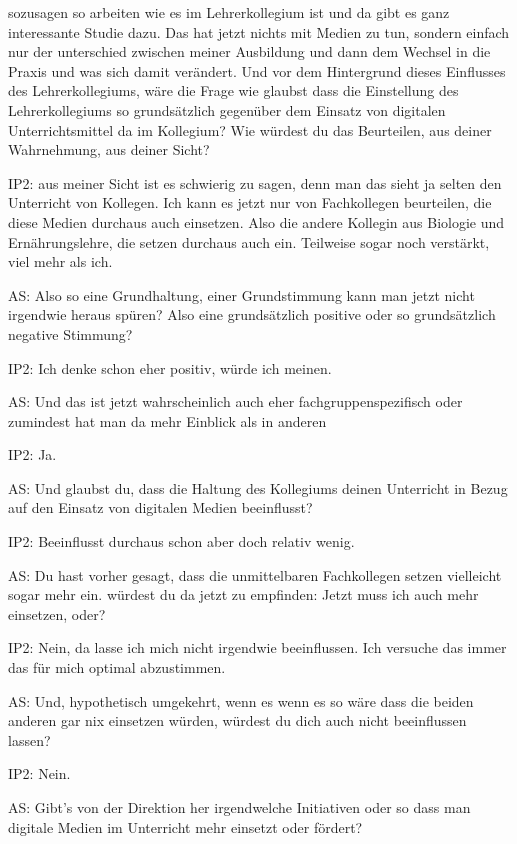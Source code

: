 \documentclass[fontsize=11pt,paper=a4]{scrbook}
\begin{document}
{\begin{itemize*}
sozusagen so arbeiten wie es im
Lehrerkollegium ist und da gibt es
ganz interessante Studie dazu. Das
hat jetzt nichts mit Medien zu tun, sondern
einfach nur der unterschied zwischen
meiner Ausbildung und dann dem
Wechsel in die Praxis und was sich damit
verändert. Und vor dem Hintergrund dieses Einflusses des
Lehrerkollegiums, wäre die Frage wie
glaubst dass die Einstellung des
Lehrerkollegiums so grundsätzlich
gegenüber dem Einsatz von digitalen
Unterrichtsmittel da im Kollegium? Wie würdest du das Beurteilen, aus deiner Wahrnehmung, aus deiner Sicht?
\item[IP2:] aus meiner Sicht ist es schwierig zu sagen, denn man das sieht ja selten den Unterricht von Kollegen. Ich kann es jetzt
nur von Fachkollegen beurteilen, die diese Medien durchaus auch einsetzen. Also
die andere Kollegin aus Biologie und
Ernährungslehre,  die setzen durchaus auch ein. Teilweise sogar noch verstärkt, viel mehr als ich.
\item[AS:] Also so eine Grundhaltung, 
einer Grundstimmung kann man jetzt nicht
irgendwie heraus spüren?  Also
eine grundsätzlich positive oder so
grundsätzlich negative Stimmung?
\item[IP2:]  Ich denke schon eher positiv, würde ich meinen.
 \item[AS:] Und das ist jetzt wahrscheinlich auch eher 
fachgruppenspezifisch oder zumindest hat man da mehr Einblick als in anderen
\item[IP2:] Ja.
\item[AS:]Und glaubst du, dass die Haltung des
Kollegiums deinen Unterricht in Bezug
auf den Einsatz von digitalen Medien
beeinflusst?
\item[IP2:]  Beeinflusst 
durchaus schon aber doch relativ wenig.
\item[AS:] Du hast vorher gesagt, dass die unmittelbaren Fachkollegen
setzen vielleicht sogar mehr ein.
würdest du da jetzt zu empfinden: Jetzt muss ich auch mehr einsetzen, oder?
\item[IP2:]  Nein, 
da lasse ich mich nicht irgendwie beeinflussen. Ich versuche das immer das für mich optimal
abzustimmen.
\item[AS:]  Und, hypothetisch
umgekehrt, wenn es wenn es so wäre dass
die beiden anderen gar nix
einsetzen würden, 
würdest du dich auch nicht beeinflussen
lassen?
\item[IP2:] Nein.
\item[AS:]  Gibt's von der Direktion her
irgendwelche Initiativen oder so dass
man digitale Medien im Unterricht mehr einsetzt oder fördert?

\end{itemize*}}
\end{document}
